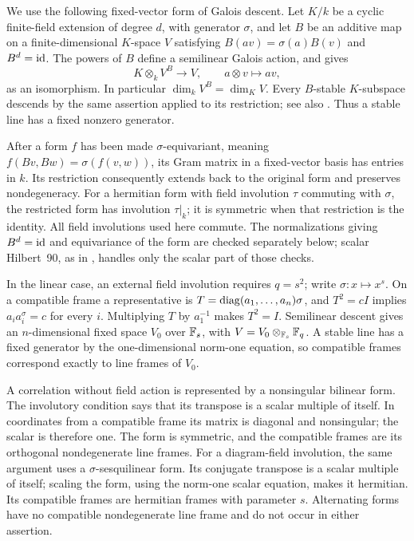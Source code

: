 We use the following fixed-vector form of Galois descent. Let $K/k$
be a cyclic finite-field extension of degree $d$, with generator
$\sigma$, and let $B$ be an additive map on a finite-dimensional
$K$-space $V$ satisfying $B(av)=\sigma(a)B(v)$ and $B^d=\operatorname{id}$.
The powers of $B$ define a semilinear Galois action, and
\citet[Proposition~5.5]{MilneDescent2024} gives
\[
 K\otimes_k V^B\longrightarrow V,\qquad a\otimes v\longmapsto av,
\]
as an isomorphism. In particular $\dim_k V^B=\dim_K V$.
Every $B$-stable $K$-subspace descends by the same assertion applied
to its restriction; see also \citet[Proposition~3.5]{MilneDescent2024}.
Thus a stable line has a fixed nonzero generator.

After a form $f$ has been made $\sigma$-equivariant, meaning
$f(Bv,Bw)=\sigma(f(v,w))$, its Gram matrix in a fixed-vector basis
has entries in $k$. Its restriction consequently
extends back to the original form and preserves nondegeneracy.
For a hermitian form with field involution $\tau$ commuting with
$\sigma$, the restricted form has involution $\tau|_k$; it is
symmetric when that restriction is the identity. All field
involutions used here commute. The normalizations giving $B^d=\operatorname{id}$
and equivariance of the form are checked separately below; scalar
Hilbert~90, as in \citet[Corollary~5.25]{MilneFields2022}, handles
only the scalar part of those checks.

In the linear case, an external field involution requires $q=s^2$;
write $\sigma:x\mapsto x^s$.  On a compatible frame a representative
is $T=\operatorname{diag}(a_1,\ldots,a_n)\sigma$, and $T^2=cI$ implies
$a_i a_i^\sigma=c$ for every $i$.  Multiplying $T$ by $a_1^{-1}$ makes
$T^2=I$.  Semilinear descent gives an $n$-dimensional fixed space
$V_0$ over $\mathbb F_s$, with $V=V_0\otimes_{\mathbb F_s}\mathbb F_q$.
A stable line has a fixed generator by the one-dimensional norm-one
equation, so compatible frames correspond exactly to line frames of
$V_0$.

A correlation without field action is represented by a nonsingular
bilinear form.  The involutory condition says that its transpose is a
scalar multiple of itself.  In coordinates from a compatible frame its
matrix is diagonal and nonsingular; the scalar is therefore one.
The form is symmetric, and the compatible frames are its orthogonal
nondegenerate line frames.  For a diagram-field involution, the same
argument uses a $\sigma$-sesquilinear form.  Its conjugate transpose is
a scalar multiple of itself; scaling the form, using the norm-one scalar
equation, makes it hermitian.  Its compatible frames are hermitian frames
with parameter $s$.  Alternating forms have no compatible nondegenerate
line frame and do not occur in either assertion.

